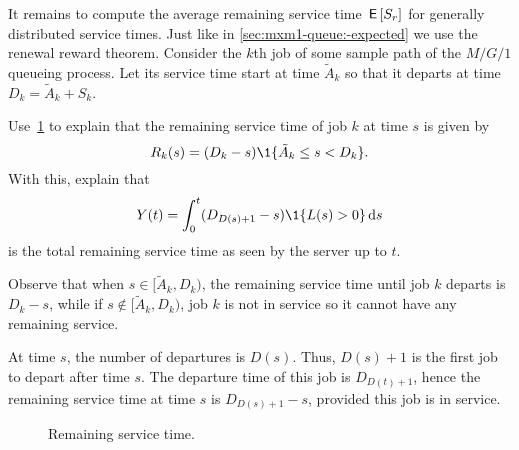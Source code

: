 It remains to compute the average remaining service time $\,\mathsf{E}\left[S_r\right]$ for generally distributed service times.
Just like in \cref{sec:mxm1-queue:-expected} we use the renewal reward theorem.
Consider the $k$th job of some sample path of the $M/G/1$ queueing process.
Let its service time start at time $\tilde A_k$ so that it departs at time $D_k=\tilde A_k + S_k$.

\begin{exercise}\label{ex:13}
  Use~\cref{fig:mg1remainingservicetime} to explain that the remaining service time of job $k$ at time $s$ is given by
\begin{equation*}
R_k(s) = (D_k-s)\1{\tilde A_k \leq s < D_k}.
\end{equation*}
With this,   explain that
  \begin{equation*}
    Y(t) = \int_0^t (D_{D(s)+1}-s)\1{L(s) > 0} \d s
  \end{equation*}
is the total remaining service time as seen by the server up to $t$. 
\begin{solution}
  Observe that when $s\in [\tilde A_k, D_k)$, the remaining service time until job $k$ departs is $D_k-s $, while if $s\not \in [\tilde A_k, D_k)$, job $k$ is not in service so it cannot have any remaining service.

  At time $s$, the number of departures is $D(s)$.
  Thus, $D(s)+1$ is the first job to depart after time $s$.
  The departure time of this job is $D_{D(t)+1}$, hence the remaining service time at time $s$ is $D_{D(s)+1}-s$, provided this job is in service.
\end{solution}
\end{exercise}


\begin{figure}[htb]
  \centering
{}

  \caption{Remaining service time.}
  \label{fig:mg1remainingservicetime}
\end{figure}

